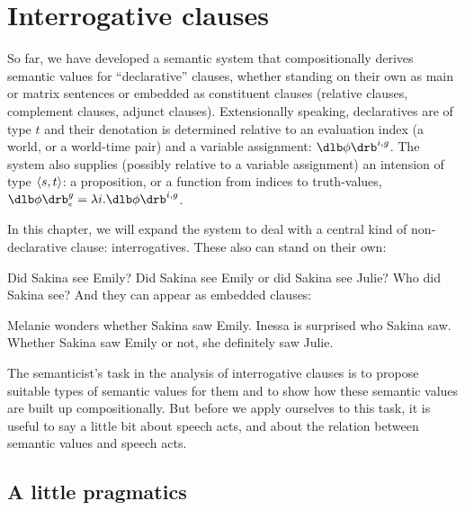 \providecommand{\ans}{\textsc{ans}\xspace}
\providecommand{\dox}{\textsc{dox}\xspace}
\chapter{Interrogative clauses}\label{cha:interrogatives}

\minitoc

So far, we have developed a semantic system that compositionally derives
semantic values for ``declarative'' clauses, whether standing on their own as
main or matrix sentences or embedded as constituent clauses (relative clauses,
complement clauses, adjunct clauses). Extensionally speaking, declaratives are
of type $t$ and their denotation is determined relative to an evaluation index
(a world, or a world-time pair) and a variable assignment: $\sv{\phi}^{i,g}$.
The system also supplies (possibly relative to a variable assignment) an
intension of type $\langle s,t \rangle$: %
%
a proposition, or a function from indices to truth-values,
$\svcent{\phi}^{g}=\lambda i.\sv{\phi}^{i,g}$.

%
In this chapter, we will expand the system to deal with a central kind of
non-declarative clause: interrogatives. These also can stand on their own:

\pex
\a Did Sakina see Emily?
\a Did Sakina see Emily or did Sakina see Julie?
\a Who did Sakina see?
\xe
%
And they can appear as embedded clauses:

\pex
\a Melanie wonders whether Sakina saw Emily.
\a Inessa is surprised who Sakina saw.
\a Whether Sakina saw Emily or not, she definitely saw Julie.
\xe

The semanticist's task in the analysis of interrogative clauses is to propose
suitable types of semantic values for them and to show how these semantic values
are built up compositionally. But before we apply ourselves to this task, it is
useful to say a little bit about speech acts, and about the relation between
semantic values and speech acts.

\section{A little pragmatics}
\label{sec:pragmatics}

